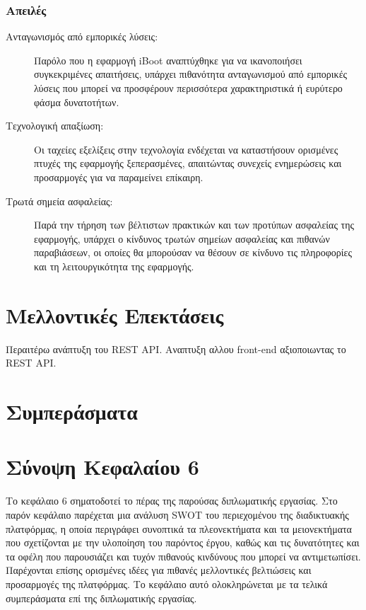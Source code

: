 \subsubsection{Απειλές}
\begin{description}
	\item[Ανταγωνισμός από εμπορικές λύσεις:] Παρόλο που η εφαρμογή iBoot αναπτύχθηκε για να ικανοποιήσει συγκεκριμένες απαιτήσεις, υπάρχει πιθανότητα ανταγωνισμού από εμπορικές λύσεις που μπορεί να προσφέρουν περισσότερα χαρακτηριστικά ή ευρύτερο φάσμα δυνατοτήτων.
	\item[Τεχνολογική απαξίωση:] Οι ταχείες εξελίξεις στην τεχνολογία ενδέχεται να καταστήσουν ορισμένες πτυχές της εφαρμογής ξεπερασμένες, απαιτώντας συνεχείς ενημερώσεις και προσαρμογές για να παραμείνει επίκαιρη.
	\item[Τρωτά σημεία ασφαλείας:] Παρά την τήρηση των βέλτιστων πρακτικών και των προτύπων ασφαλείας της εφαρμογής, υπάρχει ο κίνδυνος τρωτών σημείων ασφαλείας και πιθανών παραβιάσεων, οι οποίες θα μπορούσαν να θέσουν σε κίνδυνο τις πληροφορίες και τη λειτουργικότητα της εφαρμογής.
\end{description}

\section{Μελλοντικές Επεκτάσεις}

Περαιτέρω ανάπτυξη του REST API.
Αναπτυξη αλλου front-end αξιοποιωντας το REST API.

\section{Συμπεράσματα}

\section{Σύνοψη Κεφαλαίου 6}
Το κεφάλαιο 6 σηματοδοτεί το πέρας της παρούσας διπλωματικής εργασίας. Στο παρόν κεφάλαιο παρέχεται μια ανάλυση SWOT του περιεχομένου της διαδικτυακής πλατφόρμας, η οποία περιγράφει συνοπτικά τα πλεονεκτήματα και τα μειονεκτήματα που σχετίζονται με την υλοποίηση του παρόντος έργου, καθώς και τις δυνατότητες και τα οφέλη που παρουσιάζει και τυχόν πιθανούς κινδύνους που μπορεί να αντιμετωπίσει. Παρέχονται επίσης ορισμένες ιδέες για πιθανές μελλοντικές βελτιώσεις και προσαρμογές της πλατφόρμας. Το κεφάλαιο αυτό ολοκληρώνεται με τα τελικά συμπεράσματα επί της διπλωματικής εργασίας.
